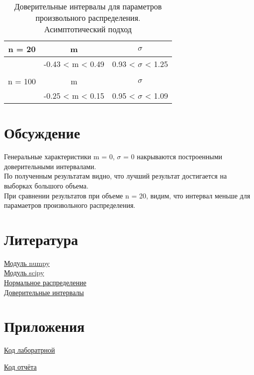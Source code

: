 \documentclass[a4]{article}
\begin{document}
		\begin{table}[h!]
			
			\caption{Доверительные интервалы для параметров произвольного распределения. Асимптотический подход}
			\label{tab:my_label}
			\begin{center}
				\vspace{5mm}
				
				\begin{tabular}{|c|c|c|}
					\hline
					n = 20 & m & $\sigma$\\
					\hline
					& -0.43 < m < 0.49 & 0.93 < $\sigma$ < 1.25\\ 
					\hline
					& & \\
					\hline
					n = 100 & m & $\sigma$\\
					\hline
					& -0.25 < m < 0.15 & 0.95 < $\sigma$ < 1.09\\
					\hline
				\end{tabular}
			\end{center}
		\end{table}

	\section{Обсуждение}
		Генеральные характеристики m = 0, $\sigma$ = 0 накрываются построенными доверительными интервалами.\\
		
		По полученным результатам видно, что лучший результат достигается на выборках большого объема.\\
		При сравнении результатов при объеме n = 20, видим, что интервал меньше для парамаетров произвольного распределения.
		
	\section{Литература}
	
	\href{https://physics.susu.ru/vorontsov/language/numpy.html}{Модуль numpy}\\
	
	\href{https://www.scipy.org/}{Модуль scipy}\\
	
	\href{https://ru.wikipedia.org/wiki/%D0%9D%D0%BE%D1%80%D0%BC%D0%B0%D0%BB%D1%8C%D0%BD%D0%BE%D0%B5_%D1%80%D0%B0%D1%81%D0%BF%D1%80%D0%B5%D0%B4%D0%B5%D0%BB%D0%B5%D0%BD%D0%B8%D0%B5}{Нормальное распределение}\\
	
	\href{http://mit.spbau.ru/sewiki/images/a/a1/Cis.pdf}{Доверительные интервалы}\\
	
	
	\section{Приложения}
	
	\href{https://github.com/LuciusGen/Matstat/blob/master/Lab6/Lab8.py}{Код лаборатрной}
	
	\href{https://github.com/LuciusGen/Matstat/blob/master/Lab6/lab8.tex}{Код отчёта}
	
\end{document}
